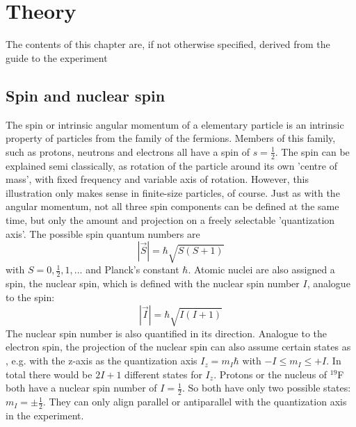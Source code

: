 \section{Theory}
The contents of this chapter are, if not otherwise specified, derived from the guide to the experiment \cite{anleitung}
\subsection{Spin and nuclear spin}
The spin or intrinsic angular momentum of a elementary particle is an intrinsic property of particles from the family of the fermions. Members of this family, such as protons, neutrons and electrons all have a spin of $s=\frac{1}{2}$.
The spin can be explained semi classically, as rotation of the particle around its own 'centre of mass', with fixed frequency and variable axis of rotation. 
However, this illustration only makes sense in finite-size particles, of course. Just as with the angular momentum, not all three spin components can be defined at the same time, but only the amount and projection on a freely selectable 'quantization axis'.
The possible spin quantum numbers are $$ \left|\vec{S}\right| = \hbar \sqrt{S\left(S+1\right)}$$ with $S = 0, \frac{1}{2}, 1, ...$ and Planck's constant $\hbar$. 
Atomic nuclei are also assigned a spin, the nuclear spin, which is defined with the nuclear spin number $I$, analogue to the spin: 
$$\left|\vec{I}\right| = \hbar \sqrt{I\left(I+1\right)}$$
The nuclear spin number is also quantified in its direction. Analogue to the electron spin, the projection of the nuclear spin can also assume certain states as , e.g. with the z-axis as the quantization axis $I_z = m_I \hbar$ with $-I\le m_I \le + I$. In total there would be  $2I+1$ different states for $I_z$. Protons or the nucleus of $^{19}$F both have a nuclear spin number of $I=\frac{1}{2}$. So both have only two possible states: $m_I = \pm \frac{1}{2}$. They can only align parallel or antiparallel with the quantization axis in the experiment.

